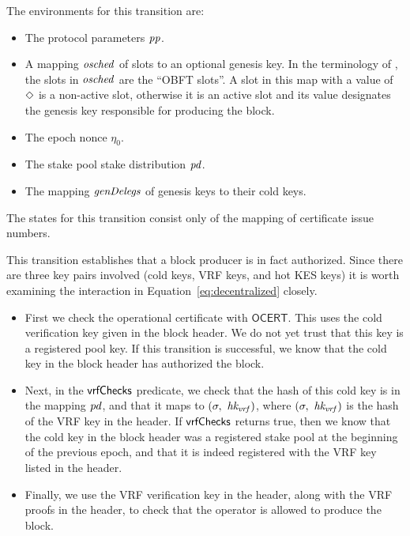 The environments for this transition are:
\begin{itemize}
  \item The protocol parameters $\mathit{pp}$.
  \item A mapping $\mathit{osched}$ of slots to an optional genesis key.
    In the terminology of \cite{delegation_design},
    the slots in $\mathit{osched}$ are the ``OBFT slots''.
    A slot in this map with a value of $\Diamond$ is a non-active slot,
    otherwise it is an active slot and its value designates the genesis key
    responsible for producing the block.
  \item The epoch nonce $\eta_0$.
  \item The stake pool stake distribution $\mathit{pd}$.
  \item The mapping $\mathit{genDelegs}$ of genesis keys to their cold keys.
\end{itemize}

The states for this transition consist only of the mapping of certificate issue numbers.

This transition establishes that a block producer is in fact authorized.
Since there are three key pairs involved (cold keys, VRF keys, and hot KES keys)
it is worth examining the interaction in Equation~\ref{eq:decentralized} closely.

\begin{itemize}
  \item First we check the operational certificate with $\mathsf{OCERT}$.
  This uses the cold verification key given in the block header.
  We do not yet trust that this key is a registered pool key.
  If this transition is successful, we know that the cold key in the block header has authorized
  the block.
\item  Next, in the $\mathsf{vrfChecks}$ predicate, we check that the hash of this cold key is in the
  mapping $\mathit{pd}$, and that it maps to $(\sigma,~\mathit{hk_{vrf}})$, where
  $(\sigma,~\mathit{hk_{vrf}})$ is the hash of the VRF key in the header.
  If $\mathsf{vrfChecks}$ returns true, then we know that the cold key in the block header was a
  registered stake pool at the beginning of the previous epoch, and that it is indeed registered
  with the VRF key listed in the header.
\item Finally, we use the VRF verification key in the header, along with the VRF proofs in the
  header, to check that the operator is allowed to produce the block.
\end{itemize}

